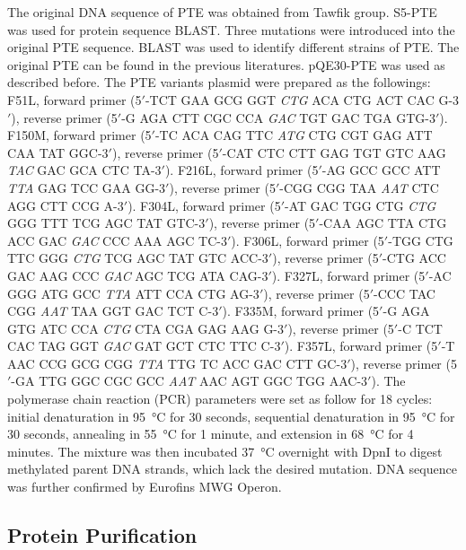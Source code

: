 \begin{refsection}
The original DNA sequence of PTE was obtained from Tawfik group. S5-PTE was
used for protein sequence BLAST. Three mutations were introduced into the
original PTE sequence. BLAST was used to identify different strains of PTE. The
original PTE can be found in the previous literatures\cite{Yang0214a}.
pQE30-PTE was used as described before\cite{Yang2014a}. The PTE variants
plasmid were prepared as the followings: F51L, forward primer
(5$'$-TCT GAA GCG GGT \emph{CTG} ACA CTG ACT CAC G-3$'$), reverse primer
(5$'$-G AGA CTT CGC CCA \emph{GAC} TGT GAC TGA GTG-3$'$). F150M, forward primer
(5$'$-TC ACA CAG TTC \emph{ATG} CTG CGT GAG ATT CAA TAT GGC-3$'$), reverse primer
(5$'$-CAT CTC CTT GAG TGT GTC AAG \emph{TAC} GAC GCA CTC TA-3$'$). F216L, forward primer
(5$'$-AG GCC GCC ATT \emph{TTA} GAG TCC GAA GG-3$'$), reverse primer
(5$'$-CGG CGG TAA \emph{AAT} CTC AGG CTT CCG A-3$'$). F304L, forward primer
(5$'$-AT GAC TGG CTG \emph{CTG} GGG TTT TCG AGC TAT GTC-3$'$), reverse primer
(5$'$-CAA AGC TTA CTG ACC GAC \emph{GAC} CCC AAA AGC TC-3$'$). F306L, forward primer
(5$'$-TGG CTG TTC GGG \emph{CTG} TCG AGC TAT GTC ACC-3$'$), reverse primer
(5$'$-CTG ACC GAC AAG CCC \emph{GAC} AGC TCG ATA CAG-3$'$). F327L, forward primer
(5$'$-AC GGG ATG GCC \emph{TTA} ATT CCA CTG AG-3$'$), reverse primer
(5$'$-CCC TAC CGG \emph{AAT} TAA GGT GAC TCT C-3$'$). F335M, forward primer
(5$'$-G AGA GTG ATC CCA \emph{CTG} CTA CGA GAG AAG G-3$'$), reverse primer
(5$'$-C TCT CAC TAG GGT \emph{GAC} GAT GCT CTC TTC C-3$'$). F357L, forward primer
(5$'$-T AAC CCG GCG CGG \emph{TTA} TTG TC ACC GAC CTT GC-3$'$), reverse primer
(5$'$-GA TTG GGC CGC GCC \emph{AAT} AAC AGT GGC TGG AAC-3$'$). The polymerase
chain reaction (PCR) parameters were set as follow for 18 cycles: initial
denaturation in \SI{95}{\celsius} for 30 seconds, sequential denaturation in
\SI{95}{\celsius} for 30 seconds, annealing in \SI{55}{\celsius} for 1 minute,
and extension in \SI{68}{\celsius} for 4 minutes. The mixture was then
incubated \SI{37}{\celsius} overnight with DpnI to digest methylated parent DNA
strands, which lack the desired mutation. DNA sequence was further confirmed by
Eurofins MWG Operon.

\subsection{Protein Purification}


\end{refsection}
